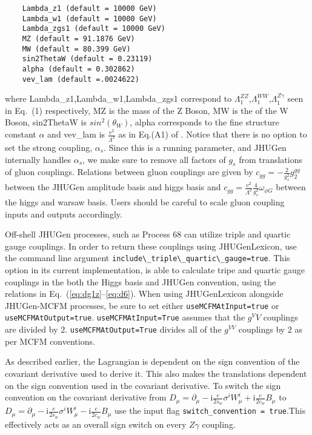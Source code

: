 \documentclass[aps,superscriptaddress,nofootinbib]{revtex4}
\begin{document}
\begin{verbatim}
    Lambda_z1 (default = 10000 GeV)
    Lambda_w1 (default = 10000 GeV)
    Lambda_zgs1 (default = 10000 GeV)
    MZ (default = 91.1876 GeV)
    MW (default = 80.399 GeV)
    sin2ThetaW (default = 0.23119)
    alpha (default = 0.302862)
    vev_lam (default =.0024622)
\end{verbatim}
where Lambda\_z1,Lambda\_w1,Lambda\_zgs1 correspond to $\Lambda_1^{ZZ}$,$\Lambda_1^{WW}$,$\Lambda_1^{Z\gamma}$ 
seen in Eq.~(1) respectively, MZ is the mass of the Z Boson, MW is the of the W Boson, sin2ThetaW is $sin^2(\theta_W)$, alpha corresponds to the fine structure constant $\alpha$ and vev\_lam is $\frac{v^2}{\Lambda^2}$ as in Eq.(A1) of \cite{Gritsan:2020pib}. Notice that there is no option to set the strong coupling, $\alpha_s$. Since this is a running parameter, and JHUGen internally handles $\alpha_s$, we make sure to remove all factors of $g_s$ from translations of gluon couplings. Relations between gluon couplings are given by $c_{gg}=-\frac{2}{g_s^2}g_2^{gg}$ between the JHUGen amplitude basis and higgs basis and $c_{gg}=\frac{v^2}{\Lambda^2}\frac{4}{g_s^2} \omega_{\phi G}$ between the higgs and warsaw basis. Users should be careful to scale gluon coupling inputs and outputs accordingly. 


Off-shell JHUGen processes, such as Process 68 can utilize triple and quartic gauge couplings. In order to return these couplings 
using JHUGenLexicon, use the command line argument \verb|include\_triple\_quartic\_gauge=true|. This option in its current implementation, 
is able to calculate tripe and quartic gauge couplings in the both the Higgs basis and JHUGen convention, using the relations in 
Eq.~(\ref{eq:dg1z}--\ref{eq:d6}). When using JHUGenLexicon alongside JHUGen-MCFM processes, be sure to set either 
\verb|useMCFMAtInput=true| or \verb|useMCFMAtOutput=true|. \verb|useMCFMAtInput=True| assumes that the $g^VV$ couplings are divided by 2. 
\verb|useMCFMAtOutput=True| divides all of the $g^{VV}$ couplings by 2 as per MCFM conventions.

As described earlier, the Lagrangian is dependent on the sign convention of the covariant derivative used to derive it. This also makes the translations dependent on the sign convention used in the covariant derivative. To switch the sign convention on the covariant derivative from $D_\mu = \partial_\mu -\mathrm{i} \frac{e}{2 s_w} \sigma^i W_\mu^i + \mathrm{i} \frac{e}{2 c_w} B_\mu$ to $D_\mu = \partial_\mu -\mathrm{i} \frac{e}{2 s_w} \sigma^i W_\mu^i - \mathrm{i} \frac{e}{2 c_w} B_\mu$ use the input flag \verb|switch_convention = true|.This effectively acts as an overall sign switch on every $Z\gamma$ coupling.
\end{document}
